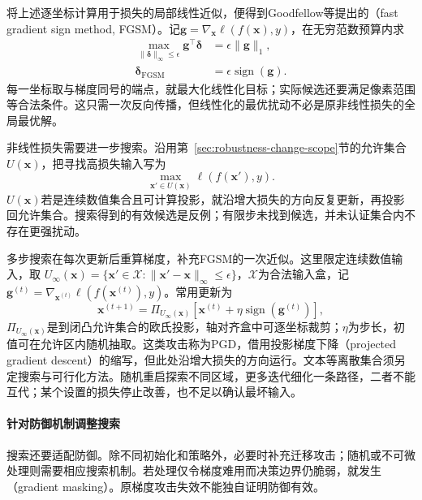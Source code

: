 将上述逐坐标计算用于损失的局部线性近似，便得到Goodfellow等提出的（fast gradient sign method, FGSM）。记$\bm{g}=\nabla_{\bm{x}}\ell(f(\bm{x}),y)$，在无穷范数预算内求
\begin{equation}
 \begin{aligned}
 \max_{\|\bm{\delta}\|_\infty\leq\epsilon}
 \bm{g}^{\top}\bm{\delta}
 &=\epsilon\|\bm{g}\|_1,\\
 \bm{\delta}_{\mathrm{FGSM}}
 &=\epsilon\operatorname{sign}(\bm{g}).
 \end{aligned}
 \label{eq:security-fgsm}
\end{equation}
每一坐标取与梯度同号的端点，就最大化线性化目标；实际候选还要满足像素范围等合法条件。这只需一次反向传播，但线性化的最优扰动不必是原非线性损失的全局最优解。

非线性损失需要进一步搜索。沿用第~\ref{sec:robustness-change-scope}节的允许集合$U(\bm x)$，把寻找高损失输入写为
\[
 \max_{\bm{x}'\in U(\bm x)}\ell(f(\bm{x}'),y).
\]
$U(\bm x)$若是连续数值集合且可计算投影，就沿增大损失的方向反复更新，再投影回允许集合。搜索得到的有效候选是反例；有限步未找到候选，并未认证集合内不存在更强扰动。

多步搜索在每次更新后重算梯度，补充FGSM的一次近似。这里限定连续数值输入，取
$U_\infty(\bm{x})=\{\bm{x}'\in\mathcal X:\lVert\bm{x}'-\bm{x}\rVert_\infty\leq\epsilon\}$，$\mathcal X$为合法输入盒，记$\bm{g}^{(t)}=\nabla_{\bm{x}^{(t)}}\ell(f(\bm{x}^{(t)}),y)$。常用更新为
\begin{equation}
 \bm{x}^{(t+1)}
 =\Pi_{U_\infty(\bm{x})}
 \left[
 \bm{x}^{(t)}
 +\eta\operatorname{sign}(\bm{g}^{(t)})
 \right],
 \label{eq:security-pgd}
\end{equation}
$\Pi_{U_\infty(\bm{x})}$是到闭凸允许集合的欧氏投影，轴对齐盒中可逐坐标裁剪；$\eta$为步长，初值可在允许区内随机抽取。这类攻击称为PGD，借用投影梯度下降（projected gradient descent）的缩写，但此处沿增大损失的方向运行。文本等离散集合须另定搜索与可行化方法。随机重启探索不同区域，更多迭代细化一条路径，二者不能互代；某个设置的损失停止改善，也不足以确认最坏输入。

\paragraph{针对防御机制调整搜索}

搜索还要适配防御。除不同初始化和策略外，必要时补充迁移攻击；随机或不可微处理则需要相应搜索机制。若处理仅令梯度难用而决策边界仍脆弱，就发生（gradient masking）。原梯度攻击失效不能独自证明防御有效。

